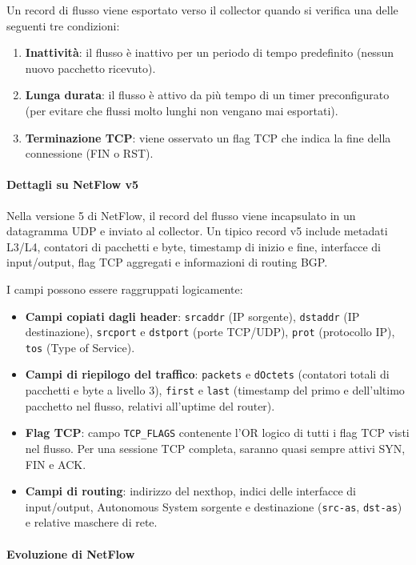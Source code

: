Un record di flusso viene esportato verso il collector quando si verifica
una delle seguenti tre condizioni:
\begin{enumerate}
\item \textbf{Inattività}: il flusso è inattivo per un periodo di tempo
predefinito (nessun nuovo pacchetto ricevuto).
\item \textbf{Lunga durata}: il flusso è attivo da più tempo di un timer
preconfigurato (per evitare che flussi molto lunghi non vengano mai esportati).
\item \textbf{Terminazione TCP}: viene osservato un flag TCP che indica la
fine della connessione (FIN o RST).
\end{enumerate}

\paragraph{Dettagli su NetFlow v5}

Nella versione 5 di NetFlow, il record del flusso viene incapsulato in un
datagramma UDP e inviato al collector. Un tipico record v5 include metadati
L3/L4, contatori di pacchetti e byte, timestamp di inizio e fine, interfacce
di input/output, flag TCP aggregati e informazioni di routing BGP.

I campi possono essere raggruppati logicamente:
\begin{itemize}
\item \textbf{Campi copiati dagli header}: \texttt{srcaddr} (IP sorgente),
\texttt{dstaddr} (IP destinazione), \texttt{srcport} e \texttt{dstport}
(porte TCP/UDP), \texttt{prot} (protocollo IP), \texttt{tos}
(Type of Service).
\item \textbf{Campi di riepilogo del traffico}: \texttt{packets} e
\texttt{dOctets} (contatori totali di pacchetti e byte a livello 3),
\texttt{first} e \texttt{last} (timestamp del primo e dell'ultimo pacchetto
nel flusso, relativi all'uptime del router).
\item \textbf{Flag TCP}: campo \texttt{TCP\_FLAGS} contenente l'OR logico
di tutti i flag TCP visti nel flusso. Per una sessione TCP completa,
saranno quasi sempre attivi SYN, FIN e ACK.
\item \textbf{Campi di routing}: indirizzo del nexthop, indici delle
interfacce di input/output, Autonomous System sorgente e destinazione
(\texttt{src-as}, \texttt{dst-as}) e relative maschere di rete.
\end{itemize}

\paragraph{Evoluzione di NetFlow}

